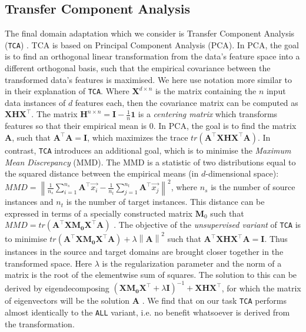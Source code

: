 \documentclass{article}
\begin{document}
\subsection{Transfer Component Analysis}

The final domain adaptation which we consider is Transfer Component Analysis (\texttt{TCA}) \citep{tca}. TCA is based on Principal Component Analysis (PCA). In PCA, the goal is to find an orthogonal linear transformation from the data's feature space into a different orthogonal basis, such that the empirical covariance between the transformed data's features is maximised. We here use notation more similar to \cite{jda} in their explanation of \texttt{TCA}. Where \(\mathbf{X}^{d \times n}\) is the matrix containing the \(n\) input data instances of \(d\) features each, then the covariance matrix can be computed as \(\mathbf{X}\mathbf{H}\mathbf{X}^{\top}\). The matrix \(\mathbf{H}^{n \times n} = \mathbf{I} - \frac{1}{n}\mathbf{1}\) is a \textit{centering matrix} which transforms features so that their empirical mean is 0. In PCA, the goal is to find the matrix \(\mathbf{A}\), such that \(\mathbf{A}^{\top}\mathbf{A} = \mathbf{I}\), which maximizes the trace \( tr(\mathbf{A}^{\top}\mathbf{X}\mathbf{H}\mathbf{X}^{\top}\mathbf{A}) \). In contrast, \texttt{TCA} introduces an additional goal, which is to minimise the \textit{Maximum Mean Discrepancy} (MMD). The MMD is a statistic of two distributions equal to the squared distance between the empirical means (in \(d\)-dimensional space): \(MMD = \left\| \frac{1}{n_s} \sum_{i=1}^{n_s}\mathbf{A}^{\top}\vec{x_i} - \frac{1}{n_t}\sum_{j=1}^{n_t}\mathbf{A}^{\top}\vec{x_j}\right\|^2 \), where \(n_s\) is the number of source instances and \(n_t\) is the number of target instances. This distance can be expressed in terms of a specially constructed matrix \(\mathbf{M}_0\) such that \(MMD = tr(\mathbf{A}^{\top}\mathbf{X}\mathbf{M_0}\mathbf{X}^{\top}\mathbf{A})\) \citep{jda}. The objective of the \textit{unsupervised variant} of \texttt{TCA} is to minimise \(tr(\mathbf{A}^{\top}\mathbf{X}\mathbf{M_0}\mathbf{X}^{\top}\mathbf{A}) + \lambda \left\| \mathbf{A} \right\|^2 \) such that \(\mathbf{A}^{\top}\mathbf{X}\mathbf{H}\mathbf{X}^{\top}\mathbf{A} = \mathbf{I} \). Thus instances in the source and target domains are brought closer together in the transformed space. Here \(\lambda\) is the regularization parameter and the norm of a matrix is the root of the elementwise sum of squares. The solution to this can be derived by eigendecomposing \((\mathbf{X}\mathbf{M_0}\mathbf{X}^{\top} + \lambda\mathbf{I})^{-1} + \mathbf{X}\mathbf{H}\mathbf{X}^{\top}\), for which the matrix of eigenvectors will be the solution \(\mathbf{A}\) \cite{tca} \cite{jda}. We find that on our task \texttt{TCA} performs almost identically to the \texttt{ALL} variant, i.e. no benefit whatsoever is derived from the transformation.
\end{document}
